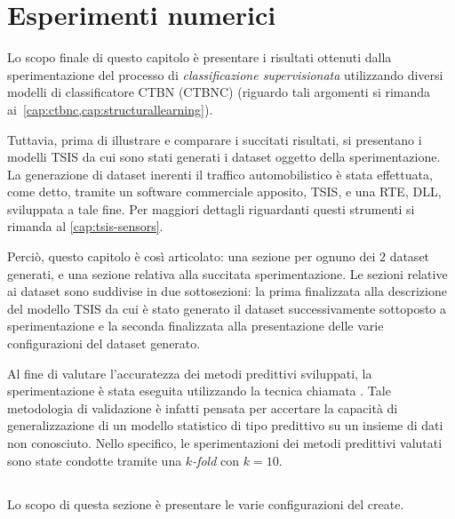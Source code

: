 
\chapter{Esperimenti numerici}\label{cap:esperimenti}
Lo scopo finale di questo capitolo è presentare i risultati ottenuti dalla sperimentazione del processo di \emph{classificazione supervisionata} utilizzando diversi modelli di classificatore \acs{CTBN} (\acs{CTBNC}) (riguardo tali argomenti si rimanda ai~\vref{cap:ctbnc,cap:structurallearning}).

Tuttavia, prima di illustrare e comparare i succitati risultati, si presentano i modelli \acs{TSIS} da cui sono stati generati i dataset oggetto della sperimentazione. La generazione di dataset inerenti il traffico automobilistico è stata effettuata, come detto, tramite un software commerciale apposito, \acs{TSIS}, e una \acl{RTE},  \acs{DLL}, sviluppata a tale fine. Per maggiori dettagli riguardanti questi strumenti si rimanda al \vref{cap:tsis-sensors}.

Perciò, questo capitolo è così articolato: una sezione per ognuno dei $2$ dataset generati, e una sezione relativa alla succitata sperimentazione. Le sezioni relative ai dataset sono suddivise in due sottosezioni: la prima finalizzata alla descrizione del modello \acs{TSIS} da cui è stato generato il dataset successivamente sottoposto a sperimentazione e la seconda finalizzata alla presentazione delle varie configurazioni del dataset generato.

Al fine di valutare l'accuratezza dei metodi predittivi sviluppati, la sperimentazione è stata eseguita utilizzando la tecnica chiamata \emph{}. Tale metodologia di validazione è infatti pensata per accertare la capacità di generalizzazione di un modello statistico di tipo predittivo su un insieme di dati non conosciuto. Nello specifico, le sperimentazioni dei metodi predittivi valutati sono state condotte tramite una \emph{$k$-fold} \emph{} con $k=10$.

\section{}\label{sec:dataset-1}
Lo scopo di questa sezione è presentare le varie configurazioni del  create.

